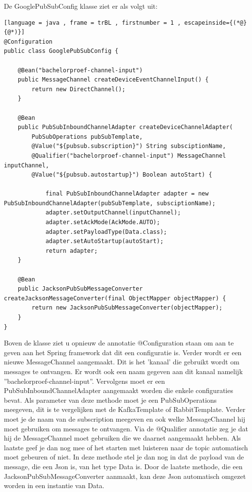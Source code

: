 De GooglePubSubConfig klasse ziet er als volgt uit:
\begin{lstlisting}[language = java , frame = trBL , firstnumber = 1 , escapeinside={(*@}{@*)}]
@Configuration
public class GooglePubSubConfig {

    @Bean("bachelorproef-channel-input")
    public MessageChannel createDeviceEventChannelInput() {
        return new DirectChannel();
    }

    @Bean
    public PubSubInboundChannelAdapter createDeviceChannelAdapter(
        PubSubOperations pubSubTemplate,
        @Value("${pubsub.subscription}") String subsciptionName,
        @Qualifier("bachelorproef-channel-input") MessageChannel inputChannel,
        @Value("${pubsub.autostartup}") Boolean autoStart) {

            final PubSubInboundChannelAdapter adapter = new PubSubInboundChannelAdapter(pubSubTemplate, subsciptionName);
            adapter.setOutputChannel(inputChannel);
            adapter.setAckMode(AckMode.AUTO);
            adapter.setPayloadType(Data.class);
            adapter.setAutoStartup(autoStart);
            return adapter;
    }

    @Bean
    public JacksonPubSubMessageConverter createJacksonMessageConverter(final ObjectMapper objectMapper) {
        return new JacksonPubSubMessageConverter(objectMapper);
    }
}
\end{lstlisting}
Boven de klasse ziet u opnieuw de annotatie @Configuration staan om aan te geven aan het Spring framework dat dit een configuratie is. Verder wordt er een nieuwe MessageChannel aangemaakt. Dit is het 'kanaal' die gebruikt wordt om messages te ontvangen. Er wordt ook een naam gegeven aan dit kanaal namelijk ''bachelorproef-channel-input''. Vervolgens moet er een PubSubInboundChannelAdapter aangemaakt worden die enkele configuraties bevat. Als parameter van deze methode moet je een PubSubOperations meegeven, dit is te vergelijken met de KafkaTemplate of RabbitTemplate. Verder moet je de naam van de subscription meegeven en ook welke MessageChannel hij moet gebruiken om messages te ontvangen. Via de @Qualifier annotatie zeg je dat hij de MessageChannel moet gebruiken die we daarnet aangemaakt hebben. Als laatste geef je dan nog mee of het starten met luisteren naar de topic automatisch moet gebeuren of niet. In deze methode stel je dan nog in dat de payload van de message, die een Json is, van het type Data is. Door de laatste methode, die een JacksonPubSubMessageConverter aanmaakt, kan deze Json automatisch omgezet worden in een instantie van Data.
